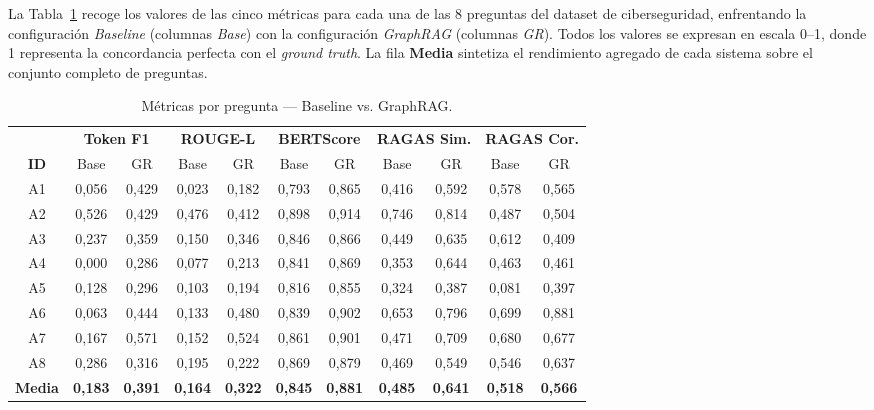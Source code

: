 La Tabla~\ref{tab:metricas_comparativa} recoge los valores de las cinco métricas para cada una de las 8 preguntas del dataset de ciberseguridad, enfrentando la configuración \textit{Baseline} (columnas \textit{Base}) con la configuración \textit{GraphRAG} (columnas \textit{GR}). Todos los valores se expresan en escala 0–1, donde 1 representa la concordancia perfecta con el \textit{ground truth}. La fila \textbf{Media} sintetiza el rendimiento agregado de cada sistema sobre el conjunto completo de preguntas.

\begin{table}[ht]
\centering
\renewcommand{\arraystretch}{1.3}
\caption{Métricas por pregunta — Baseline vs. GraphRAG.}
\label{tab:metricas_comparativa}
\begin{tabularx}{\textwidth}{|c|cc|cc|cc|cc|cc|}
\hline
 & \multicolumn{2}{c|}{\textbf{Token F1}} & \multicolumn{2}{c|}{\textbf{ROUGE-L}} & \multicolumn{2}{c|}{\textbf{BERTScore}} & \multicolumn{2}{c|}{\textbf{RAGAS Sim.}} & \multicolumn{2}{c|}{\textbf{RAGAS Cor.}} \\
\textbf{ID} & Base & GR & Base & GR & Base & GR & Base & GR & Base & GR \\ \hline
A1 & 0{,}056 & 0{,}429 & 0{,}023 & 0{,}182 & 0{,}793 & 0{,}865 & 0{,}416 & 0{,}592 & 0{,}578 & 0{,}565 \\ \hline
A2 & 0{,}526 & 0{,}429 & 0{,}476 & 0{,}412 & 0{,}898 & 0{,}914 & 0{,}746 & 0{,}814 & 0{,}487 & 0{,}504 \\ \hline
A3 & 0{,}237 & 0{,}359 & 0{,}150 & 0{,}346 & 0{,}846 & 0{,}866 & 0{,}449 & 0{,}635 & 0{,}612 & 0{,}409 \\ \hline
A4 & 0{,}000 & 0{,}286 & 0{,}077 & 0{,}213 & 0{,}841 & 0{,}869 & 0{,}353 & 0{,}644 & 0{,}463 & 0{,}461 \\ \hline
A5 & 0{,}128 & 0{,}296 & 0{,}103 & 0{,}194 & 0{,}816 & 0{,}855 & 0{,}324 & 0{,}387 & 0{,}081 & 0{,}397 \\ \hline
A6 & 0{,}063 & 0{,}444 & 0{,}133 & 0{,}480 & 0{,}839 & 0{,}902 & 0{,}653 & 0{,}796 & 0{,}699 & 0{,}881 \\ \hline
A7 & 0{,}167 & 0{,}571 & 0{,}152 & 0{,}524 & 0{,}861 & 0{,}901 & 0{,}471 & 0{,}709 & 0{,}680 & 0{,}677 \\ \hline
A8 & 0{,}286 & 0{,}316 & 0{,}195 & 0{,}222 & 0{,}869 & 0{,}879 & 0{,}469 & 0{,}549 & 0{,}546 & 0{,}637 \\ \hline
\textbf{Media} & \textbf{0{,}183} & \textbf{0{,}391} & \textbf{0{,}164} & \textbf{0{,}322} & \textbf{0{,}845} & \textbf{0{,}881} & \textbf{0{,}485} & \textbf{0{,}641} & \textbf{0{,}518} & \textbf{0{,}566} \\ \hline
\end{tabularx}
\end{table}

